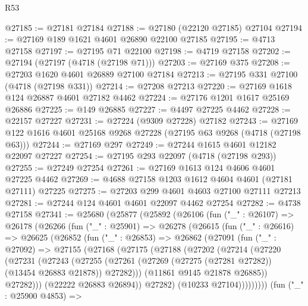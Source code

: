 \begin{lexlean}{R53}
\begin{coremodule}
@27185 := @27181 @27184
@27188 := @27180 (@22120 @27185) @27104
@27194 := @27169 @189 @1621 @4601 @26890 @22100 @27185
@27195 := @4713 @27158
@27197 := @27195 @71 @22100
@27198 := @4719 @27158
@27202 := @27194 (@27197 (@4718 (@27198 @71)))
@27203 := @27169 @375
@27208 := @27203 @1620 @4601 @26889 @27100 @27184
@27213 := @27195 @331 @27100 (@4718 (@27198 @331))
@27214 := @27208 @27213
@27220 := @27169 @1618 @124 @26887 @4601 @27182 @4462
@27224 := @27176 @1201 @1617 @25169 @26886
@27225 := @149 @26885
@27227 := @4497 @27225 @4462
@27228 := @22157 @27227
@27231 := @27224 (@9309 @27228) @27182
@27243 := @27169 @122 @1616 @4601 @25168 @9268 @27228 (@27195 @63 @9268 (@4718 (@27198 @63)))
@27244 := @27169 @297
@27249 := @27244 @1615 @4601 @12182 @22097 @27227
@27254 := @27195 @293 @22097 (@4718 (@27198 @293))
@27255 := @27249 @27254
@27261 := @27169 @1613 @124 @4606 @4601 @27225 @4462
@27269 := @4688 @27158 @1203 @1612 @4604 @4601 (@27181 @27111) @27225
@27275 := @27203 @299 @4601 @4603 @27100 @27111 @27213
@27281 := @27244 @124 @4601 @4601 @22097 @4462 @27254
@27282 := @4738 @27158
@27341 := @25680
    (@25877
      (@25892
        (@26106
          (fun ("_" : @26107) =>
          @26178
            (@26266
              (fun ("_" : @25901) =>
              @26278
                (@26615
                  (fun ("_" : @26616) =>
                  @26625
                    (@26852
                      (fun ("_" : @26853) =>
                      @26862
                        (@27091
                          (fun ("_" : @27092) =>
                          @27155
                            (@27168
                              (@27175
                                (@27188
                                  (@27202
                                    (@27214
                                      (@27220
                                        (@27231
                                          (@27243
                                            (@27255
                                              (@27261
                                                (@27269
                                                  (@27275 (@27281 @27282))
                                                  (@13454 @26883 @21878))
                                                @27282)))
                                          (@11861 @9145 @21878 @26885))
                                        @27282)))
                                  (@22222 @26883 @26894))
                                @27282)
                              (@10233 @27104)))))))))
              (fun ("_" : @25900 @4853) =>

\end{coremodule}
\end{lexlean}

